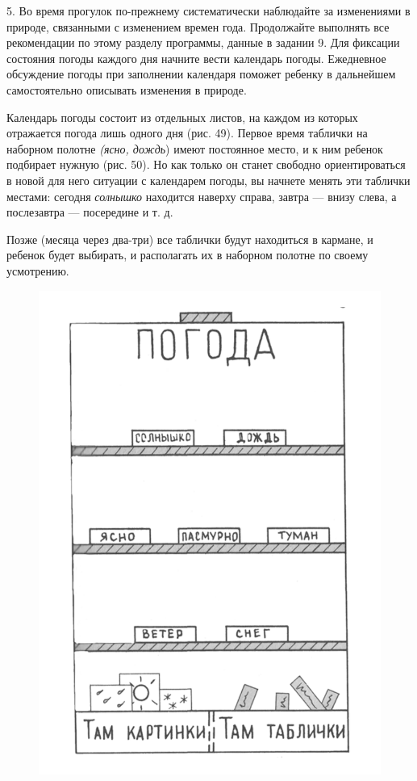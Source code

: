 \documentclass[a5paper]{book}
\renewcommand{\emph}[1]{\textit{#1}}
\begin{document}
5. Во время прогулок по-прежнему систематически наблюдайте за
изменениями в природе, связанными с изменением времен года. Продолжайте
выполнять все рекомендации по этому разделу программы, данные в задании
9. Для фиксации состояния погоды каждого дня начните вести календарь
погоды. Ежедневное обсуждение погоды при заполнении календаря поможет
ребенку в дальнейшем самостоятельно описывать изменения в природе.

Календарь погоды состоит из отдельных листов, на каждом из которых
отражается погода лишь одного дня (рис. 49). Первое время таблички на
наборном полотне \emph{(ясно, дождь}) имеют постоянное место, и к ним
ребенок подбирает нужную (рис. 50). Но как только он станет свободно
ориентироваться в новой для него ситуации с календарем погоды, вы
начнете менять эти таблички местами: сегодня \emph{солнышко} находится
наверху справа, завтра --- внизу слева, а послезавтра --- посередине и
т. д.

Позже (месяца через два-три) все таблички будут находиться в кармане, и
ребенок будет выбирать, и располагать их в наборном полотне по своему
усмотрению.

\begin{figure}
\centering
\includegraphics[width=\linewidth]{media/media/image46.png}
\end{figure}
\end{document}

